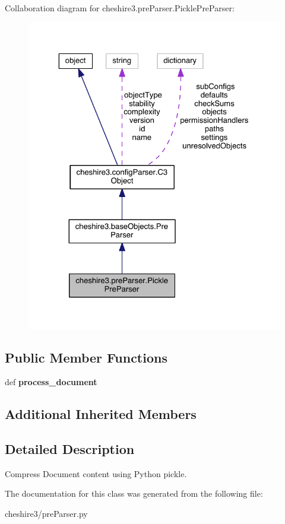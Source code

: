 Collaboration diagram for cheshire3.\-pre\-Parser.\-Pickle\-Pre\-Parser\-:
\nopagebreak
\begin{figure}[H]
\begin{center}
\leavevmode
\includegraphics[width=325pt]{classcheshire3_1_1pre_parser_1_1_pickle_pre_parser__coll__graph}
\end{center}
\end{figure}
\subsection*{Public Member Functions}
\begin{DoxyCompactItemize}
\item 
\hypertarget{classcheshire3_1_1pre_parser_1_1_pickle_pre_parser_a426b60242859657212b6bc325cb7a0de}{def {\bfseries process\-\_\-document}}\label{classcheshire3_1_1pre_parser_1_1_pickle_pre_parser_a426b60242859657212b6bc325cb7a0de}

\end{DoxyCompactItemize}
\subsection*{Additional Inherited Members}


\subsection{Detailed Description}
\begin{DoxyVerb}Compress Document content using Python pickle.\end{DoxyVerb}
 

The documentation for this class was generated from the following file\-:\begin{DoxyCompactItemize}
\item 
cheshire3/pre\-Parser.\-py\end{DoxyCompactItemize}
